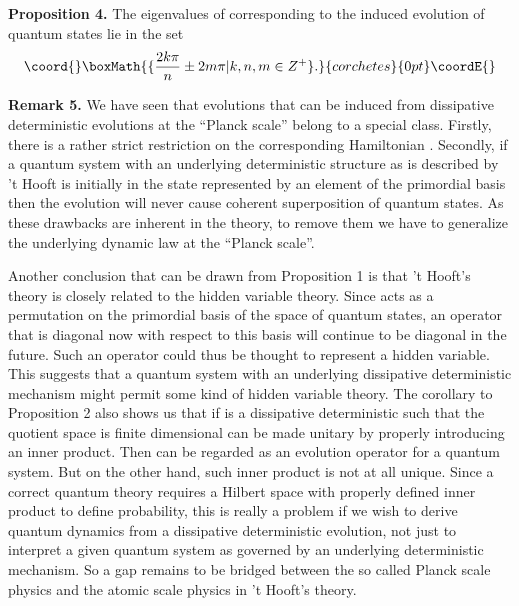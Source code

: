 \documentclass[a4paper,12pt]{article}
\begin{document}
\textbf{Proposition 4.} The eigenvalues of \coordHE{} corresponding to the induced
evolution \coordHE{} of quantum states lie in the set
\[\coord{}\boxMath{
\{\frac{2k\pi }n\pm 2m\pi |k,n,m\in Z^{+}\}.
}{corchetes}{0pt}\coordE{}\]

\textbf{Remark 5.} We have seen that evolutions that can be induced from
dissipative deterministic evolutions at the ``Planck scale'' belong to a
special class. Firstly, there is a rather strict restriction on the
corresponding Hamiltonian \coordHE{} . Secondly, if a quantum system with an
underlying deterministic structure as is described by 't Hooft is initially
in the state represented by an element of the primordial basis then the
evolution will never cause coherent superposition of quantum states. As
these drawbacks are inherent in the theory, to remove them we have to
generalize the underlying dynamic law at the ``Planck scale''.

Another conclusion that can be drawn from Proposition 1 is that 't Hooft's
theory is closely related to the hidden variable theory. Since \coordHE{} acts as a permutation on the primordial basis of the space of quantum
states, an operator that is diagonal now with respect to this basis will
continue to be diagonal in the future. Such an operator could thus be
thought to represent a hidden variable. This suggests that a quantum system
with an underlying dissipative deterministic mechanism might permit some
kind of hidden variable theory. The corollary to Proposition 2 also shows us
that if \coordHE{} is a dissipative deterministic such that the quotient space \coordHE{} is finite dimensional \coordHE{} can be made unitary by
properly introducing an inner product. Then \coordHE{} can be
regarded as an evolution operator for a quantum system. But on the other
hand, such inner product is not at all unique. Since a correct quantum
theory requires a Hilbert space with properly defined inner product to
define probability, this is really a problem if we wish to derive quantum
dynamics from a dissipative deterministic evolution, not just to interpret a
given quantum system as governed by an underlying deterministic mechanism.
So a gap remains to be bridged between the so called Planck scale physics
and the atomic scale physics in 't Hooft's theory.
\end{document}
